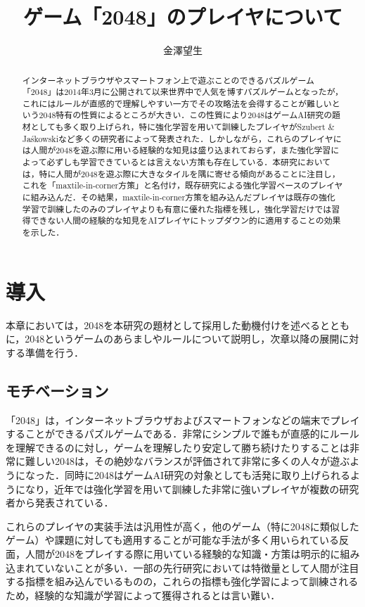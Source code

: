 \documentclass{suribt}
\title{ゲーム「2048」のプレイヤについて}
\author{金澤望生}
\begin{document}
\maketitle

\frontmatter
\begin{abstract}
インターネットブラウザやスマートフォン上で遊ぶことのできるパズルゲーム「2048」は2014年3月に公開されて以来世界中で人気を博すパズルゲームとなったが，これにはルールが直感的で理解しやすい一方でその攻略法を会得することが難しいという2048特有の性質によるところが大きい．この性質により2048はゲームAI研究の題材としても多く取り上げられ，特に強化学習を用いて訓練したプレイヤがSzubert \& Ja\'{s}kowskiなど多くの研究者によって発表された．しかしながら，これらのプレイヤには人間が2048を遊ぶ際に用いる経験的な知見は盛り込まれておらず，また強化学習によって必ずしも学習できているとは言えない方策も存在している．本研究においては，特に人間が2048を遊ぶ際に大きなタイルを隅に寄せる傾向があることに注目し，これを「maxtile-in-corner方策」と名付け，既存研究による強化学習ベースのプレイヤに組み込んだ．その結果，maxtile-in-corner方策を組み込んだプレイヤは既存の強化学習で訓練したのみのプレイヤよりも有意に優れた指標を残し，強化学習だけでは習得できない人間の経験的な知見をAIプレイヤにトップダウン的に適用することの効果を示した．
\end{abstract}

\tableofcontents

\mainmatter
\chapter{導入}
本章においては，2048を本研究の題材として採用した動機付けを述べるとともに，2048というゲームのあらましやルールについて説明し，次章以降の展開に対する準備を行う．

\section{モチベーション}
「2048」\cite{2048game}は，インターネットブラウザおよびスマートフォンなどの端末でプレイすることができるパズルゲームである．非常にシンプルで誰もが直感的にルールを理解できるのに対し，ゲームを理解したり安定して勝ち続けたりすることは非常に難しい\cite{Szubert}2048は，その絶妙なバランスが評価されて非常に多くの人々が遊ぶようになった．同時に2048はゲームAI研究の対象としても活発に取り上げられるようになり，近年では強化学習を用いて訓練した非常に強いプレイヤが複数の研究者から発表されている\cite{Szubert}\cite{Wu}\cite{Oka}\cite{Yeh}\cite{Jaskowski}．

これらのプレイヤの実装手法は汎用性が高く，他のゲーム（特に2048に類似したゲーム）や課題に対しても適用することが可能な手法が多く用いられている\cite{Yeh}反面，人間が2048をプレイする際に用いている経験的な知識・方策は明示的に組み込まれていないことが多い．一部の先行研究においては特徴量として人間が注目する指標を組み込んでいる\cite{Yeh}ものの，これらの指標も強化学習によって訓練されるため，経験的な知識が学習によって獲得されるとは言い難い．
\end{document}
